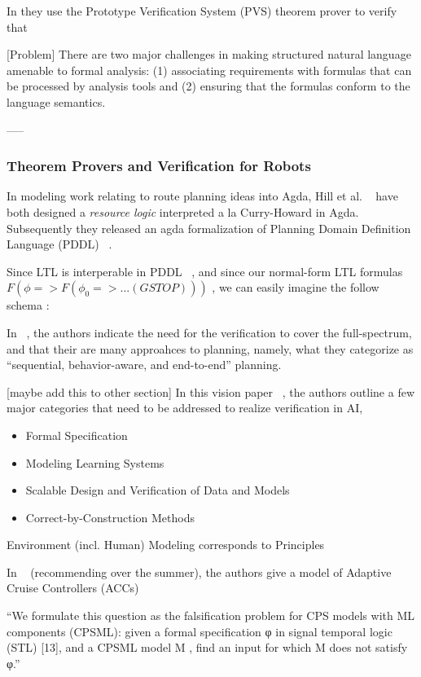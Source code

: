 \documentclass{article}
\begin{document}
In \cite{fret} they use the Prototype Verification System (PVS) theorem prover
to verify that

[Problem] There are two major challenges in making structured natural language
amenable to formal analysis: (1) associating requirements with formulas that can
be processed by analysis tools and (2) ensuring that the formulas conform to the
language semantics. \cite{fretish}

-----

\subsubsection{Theorem Provers and Verification for Robots}

In modeling work relating to route planning ideas into Agda, Hill et al.
~\cite{hillResource} have both designed a \emph{resource logic} interpreted a la
Curry-Howard in Agda. Subsequently they released  an agda formalization of
Planning Domain Definition Language (PDDL) ~\cite{hillAction}.

Since LTL is interperable in PDDL
~\cite{ltlPDDL}, and since our normal-form LTL formulas $F (\phi => F (\phi_0 => ... (G STOP)))$
, we can easily imagine the follow schema :

In ~\cite{planningForAV}, the authors indicate the need for the verification to
cover the full-spectrum, and that their are many approahces to planning, namely,
what they categorize as ``sequential, behavior-aware, and end-to-end'' planning.

[maybe add this to other section]
In this vision paper ~\cite{seshia2016towards}, the authors outline a few major
categories that need to be addressed to realize verification in AI,

\begin{itemize}
\item Formal Specification
\item Modeling Learning Systems
\item Scalable Design and Verification of Data and Models
\item Correct-by-Construction Methods
\end{itemize}

Environment (incl. Human) Modeling corresponds to Principles

In ~\cite{dreossiDS19} (recommending over the summer), the authors give a model of Adaptive Cruise Controllers (ACCs)

``We formulate this question as the falsification problem for CPS models with
ML components (CPSML): given a formal specification φ in signal temporal
logic (STL) [13], and a CPSML model M , find an input for which M does not
satisfy φ.''
\end{document}
